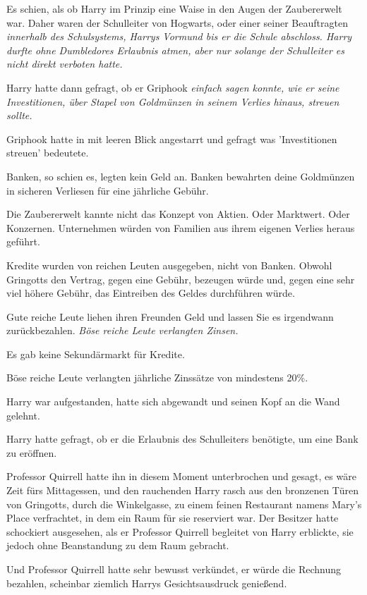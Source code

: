 {Es schien, als ob Harry im Prinzip eine Waise in den Augen der Zaubererwelt war. Daher waren der Schulleiter von Hogwarts, oder einer seiner Beauftragten \emph{innerhalb des Schulsystems, Harrys Vormund bis er die Schule abschloss. Harry \emph{durfte} ohne Dumbledores Erlaubnis atmen, aber nur solange der Schulleiter es nicht direkt verboten hatte.}

Harry hatte dann gefragt, ob er Griphook \emph{einfach sagen konnte, wie er seine Investitionen, über Stapel von Goldmünzen in seinem Verlies hinaus, streuen sollte.}

Griphook hatte in mit leeren Blick angestarrt und gefragt was 'Investitionen streuen' bedeutete.

Banken, so schien es, legten kein Geld an. Banken bewahrten deine Goldmünzen in sicheren Verliesen für eine jährliche Gebühr.

Die Zaubererwelt kannte nicht das Konzept von Aktien. Oder Marktwert. Oder Konzernen. Unternehmen würden von Familien aus ihrem eigenen Verlies heraus geführt.

Kredite wurden von reichen Leuten ausgegeben, nicht von Banken. Obwohl Gringotts den Vertrag, gegen eine Gebühr, bezeugen würde und, gegen eine sehr viel höhere Gebühr, das Eintreiben des Geldes durchführen würde.

Gute reiche Leute liehen ihren Freunden Geld und lassen Sie es irgendwann zurückbezahlen. \emph{Böse reiche Leute verlangten \emph{Zinsen.}}

Es gab keine Sekundärmarkt für Kredite.

Böse reiche Leute verlangten jährliche Zinssätze von mindestens 20\%.

Harry war aufgestanden, hatte sich abgewandt und seinen Kopf an die Wand gelehnt.

Harry hatte gefragt, ob er die Erlaubnis des Schulleiters benötigte, um eine Bank zu eröffnen.

Professor Quirrell hatte ihn in diesem Moment unterbrochen und gesagt, es wäre Zeit fürs Mittagessen, und den rauchenden Harry rasch aus den bronzenen Türen von Gringotts, durch die Winkelgasse, zu einem feinen Restaurant namens Mary's Place verfrachtet, in dem ein Raum für sie reserviert war. Der Besitzer hatte schockiert ausgesehen, als er Professor Quirrell begleitet von Harry erblickte, sie jedoch ohne Beanstandung zu dem Raum gebracht.

Und Professor Quirrell hatte sehr bewusst verkündet, er würde die Rechnung bezahlen, scheinbar ziemlich Harrys Gesichtsausdruck genießend.

}
